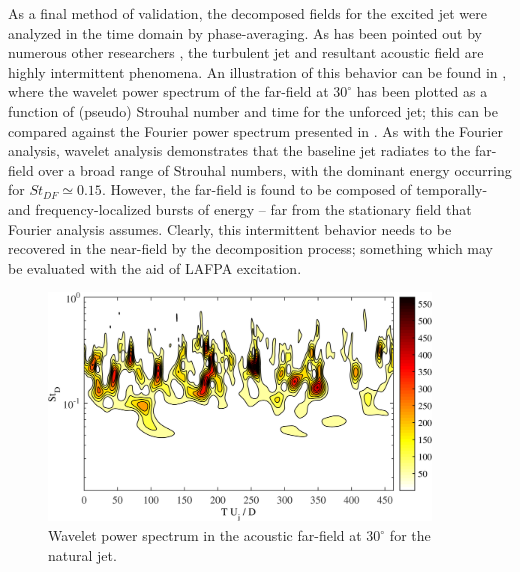 As a final method of validation, the decomposed fields for the excited jet were analyzed in the time domain by phase-averaging.
As has been pointed out by numerous other researchers \citep{Cavalieri2010,Camussi1997,Kearney-Fischer2013,Hileman2005}, the turbulent jet and resultant acoustic field are highly intermittent phenomena. 
An illustration of this behavior can be found in , where the wavelet power spectrum of the far-field at $30^\circ$ has been plotted as a function of (pseudo) Strouhal number and time for the unforced jet; this can be compared against the Fourier power spectrum presented in . 
As with the Fourier analysis, wavelet analysis demonstrates that the baseline jet radiates to the far-field over a broad range of Strouhal numbers, with the dominant energy occurring for $St_{DF} \simeq 0.15$. 
However, the far-field is found to be composed of temporally- and frequency-localized bursts of energy – far from the stationary field that Fourier analysis assumes. 
Clearly, this intermittent behavior needs to be recovered in the near-field by the decomposition process; something which may be evaluated with the aid of LAFPA excitation.
\begin{figure}
	\centering
	\includegraphics[width=4in]{Figures/ch3_wavelet_spectrum.png}
	\caption{Wavelet power spectrum in the acoustic far-field at $30^\circ$ for the natural jet.}
	\label{fig:ch3_wavelet_spectrum}
\end{figure}


